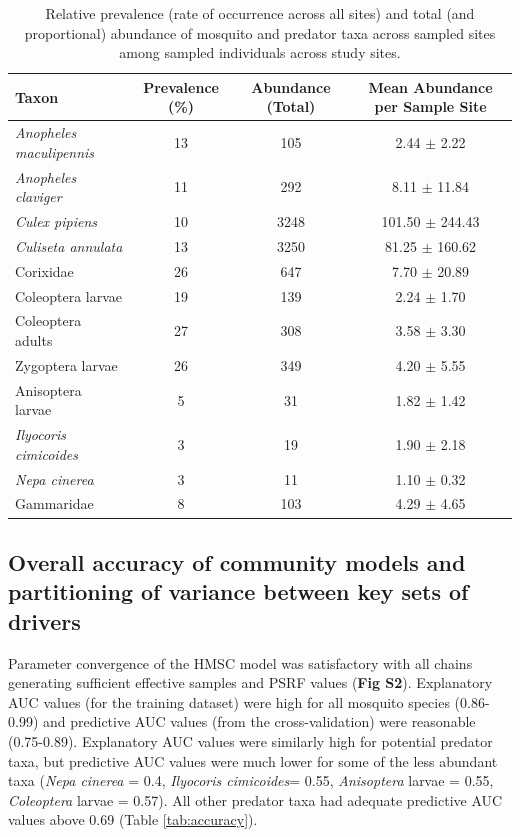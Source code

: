 \documentclass[lineno,sn-basic]{sn-jnl}%
\begin{document}
\begin{table}[htbp]
\centering
\caption{Relative prevalence (rate of occurrence across all sites) and total (and proportional) abundance of mosquito and predator taxa across sampled sites among sampled individuals across study sites.} \label{tab:abundance}
\begin{tabular}{lccc}
\toprule
\textbf{Taxon} & \textbf{Prevalence (\%)} & \textbf{Abundance (Total)} & \textbf{Mean Abundance per Sample Site} \\
\midrule
\textit{Anopheles maculipennis} & 13 & 105 & 2.44 $\pm$ 2.22 \\
\textit{Anopheles claviger} & 11 & 292 & 8.11 $\pm$ 11.84 \\
\textit{Culex pipiens} & 10 & 3248 & 101.50 $\pm$ 244.43 \\
\textit{Culiseta annulata} & 13 & 3250 & 81.25 $\pm$ 160.62 \\
Corixidae & 26 & 647 & 7.70 $\pm$ 20.89 \\
Coleoptera larvae & 19 & 139 & 2.24 $\pm$ 1.70 \\
Coleoptera adults & 27 & 308 & 3.58 $\pm$ 3.30 \\
Zygoptera larvae & 26 & 349 & 4.20 $\pm$ 5.55 \\
Anisoptera larvae & 5 & 31 & 1.82 $\pm$ 1.42 \\
\textit{Ilyocoris cimicoides} & 3 & 19 & 1.90 $\pm$ 2.18 \\
\textit{Nepa cinerea} & 3 & 11 & 1.10 $\pm$ 0.32 \\
Gammaridae & 8 & 103 & 4.29 $\pm$ 4.65 \\
\bottomrule
\end{tabular}
\end{table}

\subsection{Overall accuracy of community models and partitioning of variance between key sets of drivers}
Parameter convergence of the HMSC model was satisfactory with all chains generating sufficient effective samples and PSRF values (\textbf{Fig S2}). Explanatory AUC values (for the training dataset) were high for all mosquito species (0.86-0.99) and predictive AUC values (from the cross-validation) were reasonable (0.75-0.89). Explanatory AUC values were similarly high for potential predator taxa, but predictive AUC values were much lower for some of the less abundant taxa (\textit{Nepa cinerea} = 0.4, \textit{Ilyocoris cimicoides}= 0.55, \textit{Anisoptera} larvae = 0.55, \textit{Coleoptera }larvae = 0.57). All other predator taxa had adequate predictive AUC values above 0.69 (Table \ref{tab:accuracy}). 
\end{document}
